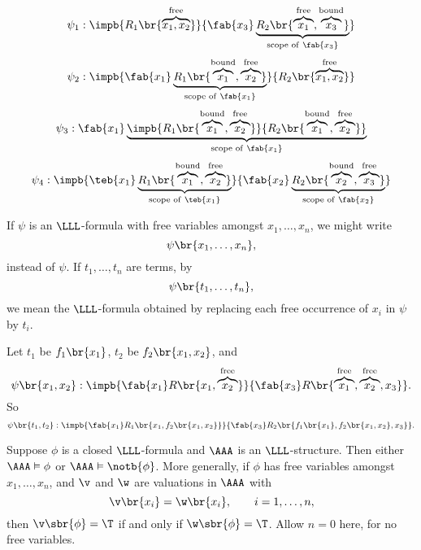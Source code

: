 \begin{example*}
$$ \psi_1 : \impb{R_1\br{\overbrace{x_1, x_2}^{\text{free}}}}{\fab{x_3}\underbrace{R_2\br{\overbrace{x_1}^{\text{free}}, \overbrace{x_3}^{\text{bound}}}}_{\text{scope of} \ \fab{x_3}}} $$
$$ \psi_2 : \impb{\fab{x_1}\underbrace{R_1\br{\overbrace{x_1}^{\text{bound}}, \overbrace{x_2}^{\text{free}}}}_{\text{scope of} \ \fab{x_1}}}{R_2\br{\overbrace{x_1, x_2}^{\text{free}}}} $$
$$ \psi_3 : \fab{x_1}\underbrace{\impb{R_1\br{\overbrace{x_1}^{\text{bound}}, \overbrace{x_2}^{\text{free}}}}{R_2\br{\overbrace{x_1}^{\text{bound}}, \overbrace{x_2}^{\text{free}}}}}_{\text{scope of} \ \fab{x_1}} $$
$$ \psi_4 : \impb{\teb{x_1}\underbrace{R_1\br{\overbrace{x_1}^{\text{bound}}, \overbrace{x_2}^{\text{free}}}}_{\text{scope of} \ \teb{x_1}}}{\fab{x_2}\underbrace{R_2\br{\overbrace{x_2}^{\text{bound}}, \overbrace{x_3}^{\text{free}}}}_{\text{scope of} \ \fab{x_2}}} $$
\end{example*}

\pagebreak

\begin{definition}
If $ \psi $ is an $ \LLL $-formula with free variables amongst $ x_1, \dots, x_n $, we might write
$$ \psi\br{x_1, \dots, x_n}, $$
instead of $ \psi $. If $ t_1, \dots, t_n $ are terms, by
$$ \psi\br{t_1, \dots, t_n}, $$
we mean the $ \LLL $-formula obtained by replacing each free occurrence of $ x_i $ in $ \psi $ by $ t_i $.
\end{definition}

\begin{example*}
Let $ t_1 $ be $ f_1\br{x_1} $, $ t_2 $ be $ f_2\br{x_1, x_2} $, and
$$ \psi\br{x_1, x_2} : \impb{\fab{x_1}R\br{x_1, \overbrace{x_2}^{\text{free}}}}{\fab{x_3}R\br{\overbrace{x_1}^{\text{free}}, \overbrace{x_2}^{\text{free}}, x_3}}. $$
So
$$ \psi\br{t_1, t_2} : \impb{\fab{x_1}R_1\br{x_1, f_2\br{x_1, x_2}}}{\fab{x_3}R_2\br{f_1\br{x_1}, f_2\br{x_1, x_2}, x_3}}. $$
\end{example*}

\begin{theorem}
\label{thm:2.3.3}
Suppose $ \phi $ is a closed $ \LLL $-formula and $ \AAA $ is an $ \LLL $-structure. Then either $ \AAA \vDash \phi $ or $ \AAA \vDash \notb{\phi} $. More generally, if $ \phi $ has free variables amongst $ x_1, \dots, x_n $, and $ \v $ and $ \w $ are valuations in $ \AAA $ with
$$ \v\br{x_i} = \w\br{x_i}, \qquad i = 1, \dots, n, $$
then $ \v\sbr{\phi} = \T $ if and only if $ \w\sbr{\phi} = \T $. Allow $ n = 0 $ here, for no free variables.
\end{theorem}

